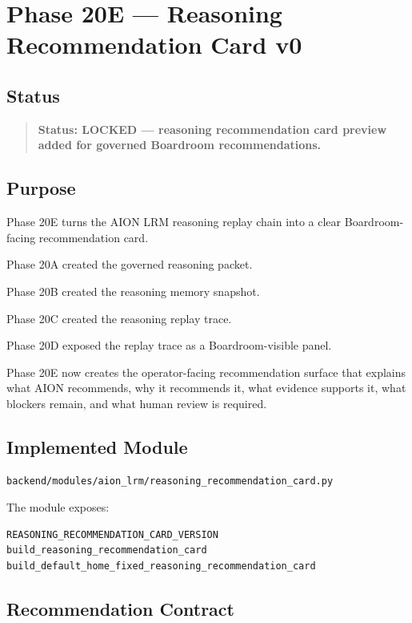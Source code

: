 \section{Phase 20E --- Reasoning Recommendation Card v0}
\label{sec:phase20e-reasoning-recommendation-card-v0}

\subsection{Status}

\begin{quote}
\textbf{Status: LOCKED --- reasoning recommendation card preview added for governed Boardroom recommendations.}
\end{quote}

\subsection{Purpose}

Phase 20E turns the AION LRM reasoning replay chain into a clear Boardroom-facing recommendation card.

Phase 20A created the governed reasoning packet.

Phase 20B created the reasoning memory snapshot.

Phase 20C created the reasoning replay trace.

Phase 20D exposed the replay trace as a Boardroom-visible panel.

Phase 20E now creates the operator-facing recommendation surface that explains what AION recommends, why it recommends it, what evidence supports it, what blockers remain, and what human review is required.

\subsection{Implemented Module}

\begin{verbatim}
backend/modules/aion_lrm/reasoning_recommendation_card.py
\end{verbatim}

The module exposes:

\begin{verbatim}
REASONING_RECOMMENDATION_CARD_VERSION
build_reasoning_recommendation_card
build_default_home_fixed_reasoning_recommendation_card
\end{verbatim}

\subsection{Recommendation Contract}

